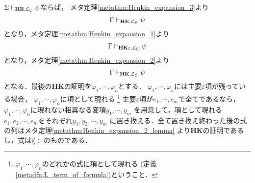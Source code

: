 	\begin{sketch}
		$\Sigma \provable{\mbox{{\bf HE}},\lang{\varepsilon}} \psi$ならば，
		メタ定理\ref{metathm:Henkin_expansion_3}より
		\begin{align}
			\Gamma \provable{\mbox{{\bf HE}},\lang{\varepsilon}} \psi
		\end{align}
		となり，メタ定理\ref{metathm:Henkin_expansion_1}より
		\begin{align}
			\Gamma \provable{\mbox{{\bf HK$\varepsilon$}},\lang{\varepsilon}} \psi
		\end{align}
		となり，メタ定理\ref{metathm:Henkin_expansion_2}より
		\begin{align}
			\Gamma \provable{\mbox{{\bf HK}},\lang{\varepsilon}} \psi
		\end{align}
		となる．最後の{\bf HK}の証明を$\varphi_{1},\cdots,\varphi_{n}$とする．
		$\varphi_{1},\cdots,\varphi_{n}$には主要$\varepsilon$項が残っている場合，
		$\varphi_{1},\cdots,\varphi_{n}$に項として現れる
		\footnote{
			$\varphi_{1},\cdots,\varphi_{n}$のどれかの式に項として現れる
			(定義\ref{metadfn:L_term_of_formula})ということ．
		}
		主要$\varepsilon$項が$e_{1},\cdots,e_{m}$で全てであるなら，
		$\varphi_{1},\cdots,\varphi_{n}$に現れない相異なる変項$y_{1},\cdots,y_{m}$
		を用意して，項として現れる$e_{1},e_{2},\cdots,e_{m}$をそれぞれ$y_{1},y_{2},\cdots,y_{m}$
		に置き換える．全て置き換え終わった後の式の列はメタ定理\ref{metathm:Henkin_expansion_2_lemma}
		より{\bf HK}の証明であるし，式は$\lang{\in}$のものである．
		\QED
	\end{sketch}
